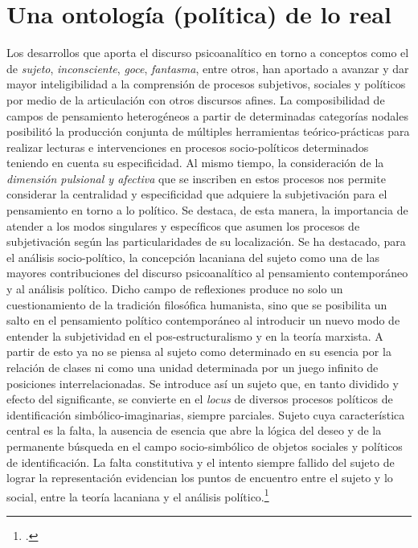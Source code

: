 \section{Una ontología (política) de lo real}

Los desarrollos que aporta el discurso psicoanalítico en torno a conceptos como el de \emph{sujeto}, \emph{inconsciente}, \emph{goce}, \emph{fantasma}, entre otros, han aportado a avanzar y dar mayor inteligibilidad a la comprensión de procesos subjetivos, sociales y políticos por medio de la articulación con otros discursos afines. La composibilidad de campos de pensamiento heterogéneos a partir de determinadas categorías nodales posibilitó la producción conjunta de múltiples herramientas teórico-prácticas para realizar lecturas e intervenciones en procesos socio-políticos determinados teniendo en cuenta su especificidad. Al mismo tiempo, la consideración de la \emph{dimensión pulsional y afectiva} que se inscriben en estos procesos nos permite considerar la centralidad y especificidad que adquiere la subjetivación para el pensamiento en torno a lo político. Se destaca, de esta manera, la importancia de atender a los modos singulares y específicos que asumen los procesos de subjetivación  según las particularidades de su localización. Se ha destacado, para el análisis socio-político, la concepción lacaniana del sujeto como una de las mayores contribuciones del discurso psicoanalítico al pensamiento contemporáneo y al análisis político. Dicho campo de reflexiones produce no solo un cuestionamiento de la tradición filosófica humanista, sino que se posibilita un salto en el pensamiento político contemporáneo al introducir un nuevo modo de entender la subjetividad en el pos-estructuralismo y en la teoría marxista. A partir de esto ya no se piensa al sujeto como determinado en su esencia por la relación de clases ni como una unidad determinada por un juego infinito de posiciones interrelacionadas. Se introduce así un sujeto que, en tanto dividido y efecto del significante, se convierte en el \emph{locus} de diversos procesos políticos de identificación simbólico-imaginarias, siempre parciales. Sujeto cuya característica central es la falta, la ausencia de esencia que abre la lógica del deseo y de la permanente búsqueda en el campo socio-simbólico de objetos sociales y políticos de identificación. La falta constitutiva y el intento siempre fallido del sujeto de lograr la representación evidencian los puntos de encuentro entre el sujeto y lo social, entre la teoría lacaniana y el análisis político.\footcite[]{@7107-STAVRAKAKIS2007}

